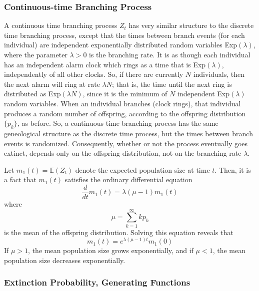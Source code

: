 \documentclass{article}
\begin{document}
    \subsubsection{Continuous-time Branching Process}

      A continuous time branching process $Z_t$ has very similar structure to the discrete time branching process, except that the times between branch events (for each individual) are independent exponentially distributed random variables Exp$(\lambda)$, where the parameter $\lambda> 0$ is the branching rate. It is as though each individual has an independent alarm clock which rings as a time that is Exp$(\lambda)$, independently of all other clocks. So, if there are currently $N$ individuals, then the next alarm will ring at rate $\lambda N$; that is, the time until the next ring is distributed as Exp$(\lambda N)$, since it is the minimum of $N$ independent Exp$(\lambda)$ random variables. When an individual branches (clock rings), that individual produces a random number of offspring, according to the offspring distribution $\{p_k\}$, as before. So, a continuous time branching process has the same geneological structure as the discrete time process, but the times between branch events is randomized. Consequently, whether or not the process eventually goes extinct, depends only on the offspring distribution, not on the branching rate $\lambda$. 

      Let $m_1(t) = \mathbb{E}(Z_t)$ denote the expected population size at time $t$. Then, it is a fact that $m_1(t)$ satisfies the ordinary differential equation
      \begin{equation}
        \frac{d}{d t} m_1 (t) = \lambda(\mu - 1) m_1 (t)
      \end{equation}
      where 
      \begin{equation}
        \mu = \sum_{k=1}^\infty k p_k
      \end{equation}
      is the mean of the offspring distribution. Solving this equation reveals that 
      \begin{equation}
        m_1 (t) = e^{\lambda (\mu-1) t} m_1 (0)
      \end{equation}
      If $\mu > 1$, the mean population size grows exponentially, and if $\mu < 1$, the mean population size decreases exponentially. 

    \subsubsection{Extinction Probability, Generating Functions}
\end{document}
